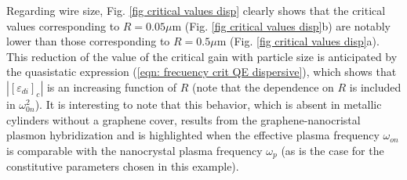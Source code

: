 \documentclass[9pt,twocolumn,twoside]{osajnl}
\begin{document}
Regarding wire size, Fig. \ref{fig critical values disp} clearly shows that the critical values corresponding to $R=0.05\mu$m (Fig. \ref{fig critical values disp}b) are notably lower than those corresponding to $R=0.5\mu$m (Fig. \ref{fig critical values disp}a). This reduction of the value of the critical gain with particle size 
is anticipated by the quasistatic expression (\ref{eqn: frecuency crit QE dispersive}), which shows that  $|[\varepsilon_{di}]_c|$ is an increasing function of $R$ (note that the dependence on $R$ is included in $\omega^2_{0n}$). It is interesting to note that this behavior, which is absent in metallic cylinders without a graphene cover, results from the graphene-nanocristal plasmon hybridization and is highlighted when the effective plasma frequency $\omega_{on}$ is comparable with the nanocrystal plasma frequency $\omega_p$ (as is the case for the constitutive parameters chosen in this  example). 

%
%
%
%


\end{document}
